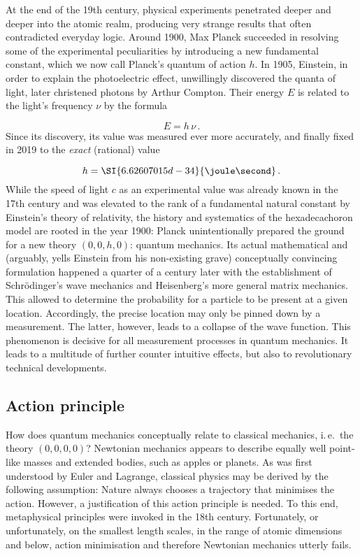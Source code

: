 
\newpage {}
\label{sec:0010}

At the end of the 19th century, physical experiments penetrated deeper and deeper into the atomic realm, producing very strange results that often contradicted everyday logic. Around 1900, Max Planck succeeded in resolving some of the experimental peculiarities by introducing a new fundamental constant, which we now call Planck's quantum of action $h$. In 1905, Einstein, in order to explain the photoelectric effect, unwillingly discovered the quanta of light, later christened photons by Arthur Compton. Their energy $E$ is related to the light's frequency $\nu$ by the formula

\begin{equation*}
  E=h\,\nu\,.
\end{equation*}
%
Since its discovery, its value was measured ever more accurately, and finally fixed in 2019 to the \emph{exact} (rational) value 

\begin{equation*}
  h=\SI{6.62607015d-34}{\joule\second}\,.
\end{equation*}
%
While the speed of light $c$ as an experimental value was already known in the 17th century and was elevated to the rank of a fundamental natural constant by Einstein's theory of relativity, the history and systematics of the hexadecachoron model are rooted in the year 1900: Planck unintentionally prepared the ground for a new theory $(0,0,h,0)$: quantum mechanics. Its actual mathematical and (arguably, yells Einstein from his non-existing grave) conceptually convincing formulation happened a quarter of a century later with the establishment of Schrödinger's wave mechanics and Heisenberg's more general matrix mechanics. This allowed to determine the probability for a particle to be present at a given location. Accordingly, the precise location may only be pinned down by a measurement. The latter, however, leads to a collapse of the wave function. This phenomenon is decisive for all measurement processes in quantum mechanics. It leads to a multitude of further counter intuitive effects, but also to revolutionary technical developments.


\subsection*{Action principle}

How does quantum mechanics conceptually relate to classical mechanics, i.\,e.\ the theory $(0,0,0,0)$? Newtonian mechanics appears to describe equally well point-like masses and extended bodies, such as apples or planets. As was first understood by Euler and Lagrange, classical physics may be derived by the following assumption: Nature always chooses a trajectory that minimises the action. However, a justification of this action principle is needed. To this end, metaphysical principles were invoked in the 18th century. Fortunately, or unfortunately, on the smallest length scales, in the range of atomic dimensions and below, action minimisation and therefore Newtonian mechanics utterly fails.



